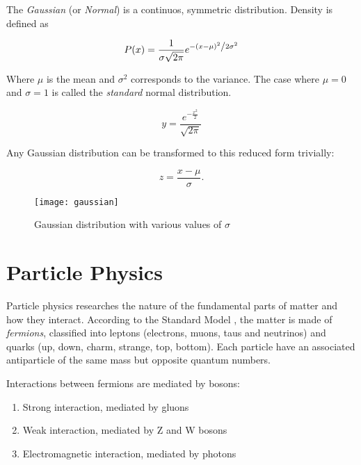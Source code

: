 The \textit{Gaussian} (or \textit{Normal}) is a continuos, symmetric distribution. Density is defined as

\begin{equation}
	P(x) = \frac{1}{{\sigma \sqrt {2\pi } }}e^{{{ - \left( {x - \mu } \right)^2 } \mathord{\left/ {\vphantom {{ - \left( {x - \mu } \right)^2 } {2\sigma ^2 }}} \right. \kern-\nulldelimiterspace} {2\sigma ^2 }}}
\end{equation}

Where $\mu$ is the mean and $\sigma ^2$ corresponds to the variance. The case where $\mu = 0$ and $\sigma = 1$ is called the \textit{standard} normal distribution.

\begin{equation}
	y = \frac{e^{ - \frac{{x^2 }}{2}}}{{\sqrt {2\pi } }}
\end{equation}

Any Gaussian distribution can be transformed to this reduced form trivially:

\begin{equation}
	z = \frac{x-\mu}{\sigma}.
\end{equation}

\begin{figure}
	\centerline{
		\texttt{[image: gaussian]}}
	\caption{Gaussian distribution with various values of $\sigma$ \cite{leo2012techniques}}
\end{figure}

\section{Particle Physics}

Particle physics researches the nature of the fundamental parts of matter and how they interact. According to the Standard Model \cite{Quang:1998yw}, the matter is made of \textit{fermions}, classified into leptons (electrons, muons, taus and neutrinos) and quarks (up, down, charm, strange, top, bottom). Each particle have an associated antiparticle of the same mass but opposite quantum numbers.

Interactions between fermions are mediated by bosons:

\begin{enumerate}
	\item Strong interaction, mediated by gluons
	\item Weak interaction, mediated by Z and W bosons
	\item Electromagnetic interaction, mediated by photons
\end{enumerate}


